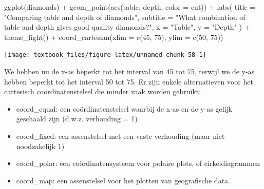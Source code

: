 \documentclass[]{tufte-book}
\newenvironment{Shaded}{}{}
\newcommand{\AttributeTok}[1]{\textcolor[rgb]{0.49,0.56,0.16}{#1}}
\newcommand{\DecValTok}[1]{\textcolor[rgb]{0.25,0.63,0.44}{#1}}
\newcommand{\FunctionTok}[1]{\textcolor[rgb]{0.02,0.16,0.49}{#1}}
\newcommand{\NormalTok}[1]{#1}
\newcommand{\SpecialCharTok}[1]{\textcolor[rgb]{0.25,0.44,0.63}{#1}}
\newcommand{\StringTok}[1]{\textcolor[rgb]{0.25,0.44,0.63}{#1}}
\providecommand{\tightlist}{%
  \setlength{\itemsep}{0pt}\setlength{\parskip}{0pt}}
\begin{document}
\begin{Shaded}
\begin{Highlighting}[]
\FunctionTok{ggplot}\NormalTok{(diamonds) }\SpecialCharTok{+}
  \FunctionTok{geom\_point}\NormalTok{(}\FunctionTok{aes}\NormalTok{(table, depth, }\AttributeTok{color =}\NormalTok{ cut)) }\SpecialCharTok{+}
  \FunctionTok{labs}\NormalTok{(}
    \AttributeTok{title =} \StringTok{"Comparing table and depth of diamonds"}\NormalTok{,}
    \AttributeTok{subtitle =} \StringTok{"What combination of table and depth gives good quality diamonds?"}\NormalTok{,}
    \AttributeTok{x =} \StringTok{"Table"}\NormalTok{,}
    \AttributeTok{y =} \StringTok{"Depth"}
\NormalTok{  ) }\SpecialCharTok{+}
  \FunctionTok{theme\_light}\NormalTok{() }\SpecialCharTok{+}
  \FunctionTok{coord\_cartesian}\NormalTok{(}\AttributeTok{xlim =} \FunctionTok{c}\NormalTok{(}\DecValTok{45}\NormalTok{, }\DecValTok{75}\NormalTok{), }\AttributeTok{ylim =} \FunctionTok{c}\NormalTok{(}\DecValTok{50}\NormalTok{, }\DecValTok{75}\NormalTok{))}
\end{Highlighting}
\end{Shaded}

\texttt{[image: textbook\_files/figure-latex/unnamed-chunk-58-1]}

We hebben nu de x-as beperkt tot het interval van 45 tot 75, terwijl we de y-as hebben beperkt tot het interval 50 tot 75. Er zijn enkele alternatieven voor het cartesisch coördinatenstelsel die minder vaak worden gebruikt:

\begin{itemize}
\tightlist
\item
  coord\_equal: een coördinatenstelsel waarbij de x-as en de y-as gelijk geschaald zijn (d.w.z. verhouding = 1)
\item
  coord\_fixed: een assenstelsel met een vaste verhouding (maar niet noodzakelijk 1)
\item
  coord\_polar: een coördinatensysteem voor polaire plots, of cirkeldiagrammen
\item
  coord\_map: een assenstelsel voor het plotten van geografische data.
\end{itemize}
\end{document}
